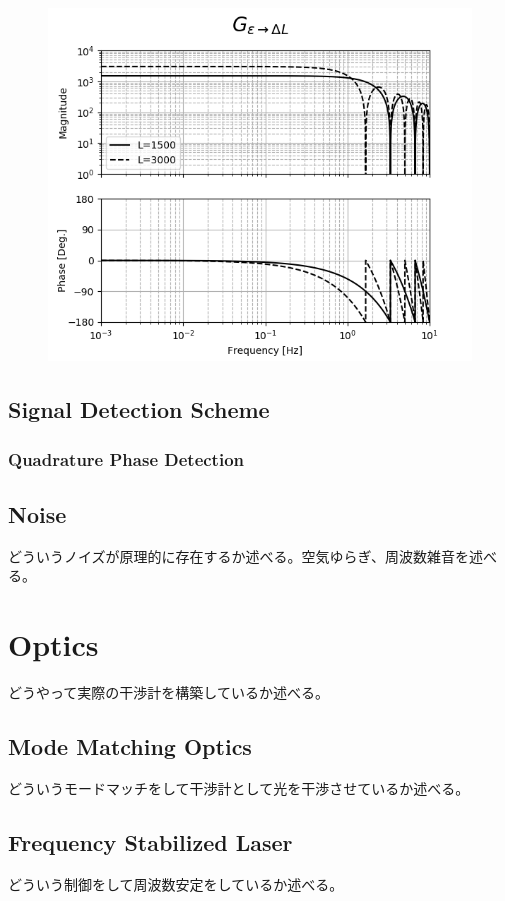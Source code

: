 \begin{figure}[h]
  \begin{center}
    \includegraphics[width=12.0cm]{./img_chap4/img412.png}
    \caption{}
  \end{center}
\end{figure}


\subsection{Signal Detection Scheme}
\subsubsection{Quadrature Phase Detection}


\subsection{Noise}
どういうノイズが原理的に存在するか述べる。空気ゆらぎ、周波数雑音を述べる。




\section{Optics} %
どうやって実際の干渉計を構築しているか述べる。
\subsection{Mode Matching Optics}
どういうモードマッチをして干渉計として光を干渉させているか述べる。
\subsection{Frequency Stabilized Laser}
どういう制御をして周波数安定をしているか述べる。

